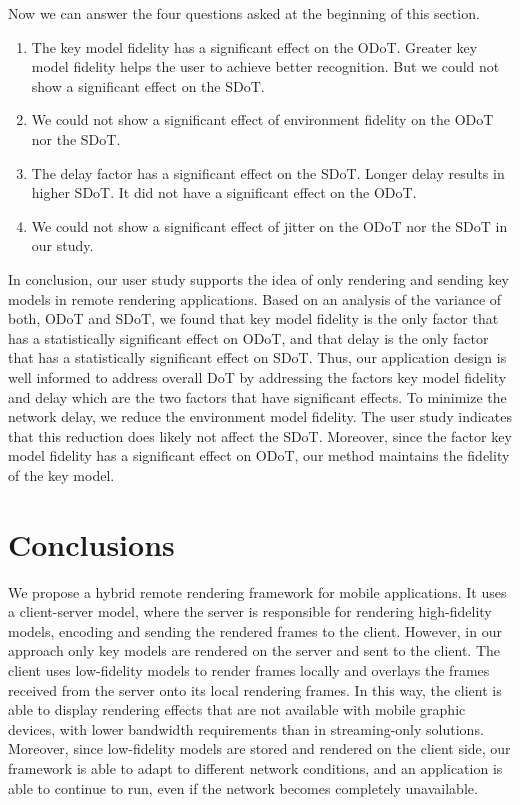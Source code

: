 Now we can answer the four questions asked at the beginning of this section.
\begin{enumerate}
\item
The key model fidelity has a significant effect on the ODoT. Greater key model fidelity helps the user to achieve better recognition. But we could not show a significant effect on the SDoT. 
\item
We could not show a significant effect of  environment fidelity on the ODoT nor the SDoT.
\item
The delay factor has a significant effect on the SDoT. Longer delay results in higher SDoT. It did not have a significant effect on the ODoT.
\item
We could not show a significant effect of jitter on the ODoT nor the SDoT in our study.
\end{enumerate}

In conclusion, our user study supports the idea of only rendering and sending key models in remote rendering applications.
Based on an analysis of the variance of both, ODoT and SDoT, we found that key model fidelity is the only factor that has a statistically significant effect on ODoT, and that delay is the only factor that has a statistically significant effect on SDoT.
Thus, our application design is well informed to address overall DoT by addressing the factors key model fidelity and delay which are the two factors that have significant effects.
To minimize the network delay, we reduce the environment model fidelity. The user study indicates that this reduction does likely not affect the SDoT.
Moreover, since the factor key model fidelity has a significant effect on ODoT, our method maintains the fidelity of the key model.

\section{Conclusions}

We propose a hybrid remote rendering framework for mobile applications.
It uses a client-server model, where the server is responsible for rendering high-fidelity models, encoding and sending the rendered frames to the client. However, in our approach only key models are rendered on the server and sent to the client. The client uses low-fidelity models to render frames locally and overlays the frames received from the server onto its local rendering frames.
In this way, the client is able to display rendering effects that are not available with mobile graphic devices, with lower bandwidth requirements than in streaming-only solutions.
Moreover, since low-fidelity models are stored and rendered on the client side, our framework is able to adapt to different network conditions, and an application is able to continue to run, even if the network becomes completely unavailable.

